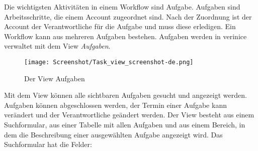 \documentclass[a4paper,10pt]{book}
\begin{document}
Die wichtigsten Aktivitäten in einem Workflow sind Aufgabe. Aufgaben sind Arbeitsschritte, die einem Account zugeordnet sind. Nach der Zuordnung ist der Account der Verantwortliche für die Aufgabe und muss diese erledigen. Ein Workflow kann aus mehreren Aufgaben bestehen. Aufgaben werden in verinice verwaltet mit dem View \textit{Aufgaben}.
\begin{figure}[htb!]
  \centering
  \texttt{[image: Screenshot/Task\_view\_screenshot-de.png]}
  \caption{\label{fig:view-aufgaben} Der View Aufgaben}
\end{figure}
Mit dem View können alle sichtbaren Aufgaben gesucht und angezeigt werden. Aufgaben können abgeschlossen werden, der Termin einer Aufgabe kann verändert und der Verantwortliche geändert werden. Der View besteht aus einem Suchformular, aus einer Tabelle mit allen Aufgaben und aus einem Bereich, in dem die Beschreibung einer ausgewählten Aufgabe angezeigt wird. Das Suchformular hat die Felder:
\end{document}

